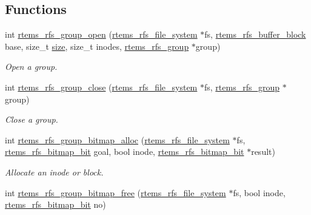 \subsection*{Functions}
\begin{DoxyCompactItemize}
\item 
int \mbox{\hyperlink{rtems-rfs-group_8c_ac8ab81ba00e5100d7f755ff951b28a83}{rtems\+\_\+rfs\+\_\+group\+\_\+open}} (\mbox{\hyperlink{struct__rtems__rfs__file__system}{rtems\+\_\+rfs\+\_\+file\+\_\+system}} $\ast$fs, \mbox{\hyperlink{rtems-rfs-buffer_8h_a5650d53328a5af0a78198fe780aec043}{rtems\+\_\+rfs\+\_\+buffer\+\_\+block}} base, size\+\_\+t \mbox{\hyperlink{sun4u_2tte_8h_a245260f6f74972558f61b85227df5aae}{size}}, size\+\_\+t inodes, \mbox{\hyperlink{group__rtems__rfs_ga0e7b27c60e21039ef07a8c843fa8a3e5}{rtems\+\_\+rfs\+\_\+group}} $\ast$group)
\begin{DoxyCompactList}\small\item\em Open a group. \end{DoxyCompactList}\item 
int \mbox{\hyperlink{rtems-rfs-group_8c_a5f2a47d06d6a8209b182348b7b38f91d}{rtems\+\_\+rfs\+\_\+group\+\_\+close}} (\mbox{\hyperlink{struct__rtems__rfs__file__system}{rtems\+\_\+rfs\+\_\+file\+\_\+system}} $\ast$fs, \mbox{\hyperlink{group__rtems__rfs_ga0e7b27c60e21039ef07a8c843fa8a3e5}{rtems\+\_\+rfs\+\_\+group}} $\ast$group)
\begin{DoxyCompactList}\small\item\em Close a group. \end{DoxyCompactList}\item 
int \mbox{\hyperlink{rtems-rfs-group_8c_a41c38f1d939cf04cad27dde05f52c394}{rtems\+\_\+rfs\+\_\+group\+\_\+bitmap\+\_\+alloc}} (\mbox{\hyperlink{struct__rtems__rfs__file__system}{rtems\+\_\+rfs\+\_\+file\+\_\+system}} $\ast$fs, \mbox{\hyperlink{rtems-rfs-bitmaps_8h_acc1b0aefe1b090890ccbc1b05279a78e}{rtems\+\_\+rfs\+\_\+bitmap\+\_\+bit}} goal, bool inode, \mbox{\hyperlink{rtems-rfs-bitmaps_8h_acc1b0aefe1b090890ccbc1b05279a78e}{rtems\+\_\+rfs\+\_\+bitmap\+\_\+bit}} $\ast$result)
\begin{DoxyCompactList}\small\item\em Allocate an inode or block. \end{DoxyCompactList}\item 
int \mbox{\hyperlink{rtems-rfs-group_8c_a00a3fb9f49f96fbef91adf13ae1622b7}{rtems\+\_\+rfs\+\_\+group\+\_\+bitmap\+\_\+free}} (\mbox{\hyperlink{struct__rtems__rfs__file__system}{rtems\+\_\+rfs\+\_\+file\+\_\+system}} $\ast$fs, bool inode, \mbox{\hyperlink{rtems-rfs-bitmaps_8h_acc1b0aefe1b090890ccbc1b05279a78e}{rtems\+\_\+rfs\+\_\+bitmap\+\_\+bit}} no)

\end{DoxyCompactItemize}
